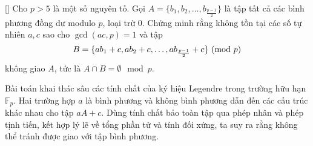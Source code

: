\documentclass[../08-quadratic-residues.tex]{subfiles}
\begin{document}
\begin{example*}\label{example:IRN-2015-MO-N3}[\textbf{}]
    Cho \( p > 5 \) là một số nguyên tố. Gọi \( A = \{b_1, b_2, \dots, b_{\frac{p-1}{2}}\} \)
    là tập tất cả các bình phương đồng dư modulo \( p \), loại trừ 0.
    Chứng minh rằng không tồn tại các số tự nhiên \( a, c \) sao cho \( \gcd(ac, p) = 1 \) và tập
    \[
        B = \{ab_1 + c, ab_2 + c, \dots, ab_{\frac{p-1}{2}} + c\} \ (\mathrm{mod}\ p)
    \]
    không giao \( A \), tức là \( A \cap B = \emptyset \mod{p} \).
\end{example*}

\begin{story*}
    Bài toán khai thác sâu các tính chất của ký hiệu Legendre trong trường hữu hạn \( \mathbb{F}_p \). Hai trường hợp \( a \) là bình phương và không bình phương dẫn đến các cấu trúc khác nhau cho tập \( aA + c \). Dùng tính chất bảo toàn tập qua phép nhân và phép tịnh tiến, kết hợp lý lẽ về tổng phần tử và tính đối xứng, ta suy ra rằng không thể tránh được giao với tập bình phương.
\end{story*}
\end{document}
